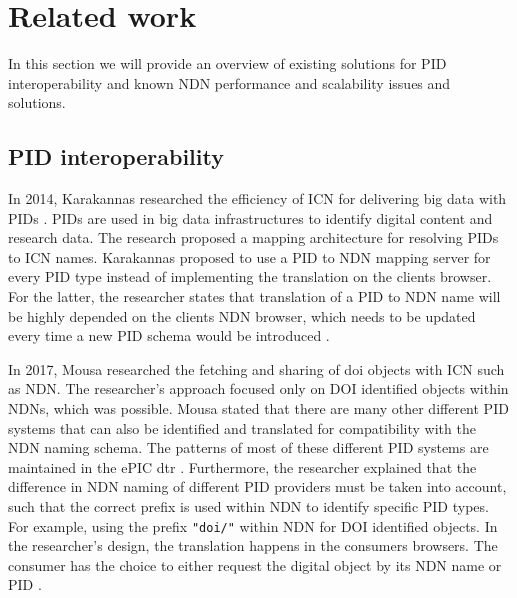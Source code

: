 \section{Related work}
\label{introduction-related-work}

In this section we will provide an overview of existing solutions for PID interoperability and known NDN performance and scalability issues and solutions.

\subsection{PID interoperability}
\label{introduction-pid}
In 2014, Karakannas researched the efficiency of ICN for delivering big data with PIDs \cite{icn-bd}. PIDs are used in big data infrastructures to identify digital content and research data. The research proposed a mapping architecture for resolving PIDs to ICN names. Karakannas proposed to use a PID to NDN mapping server for every PID type instead of implementing the translation on the clients browser. For the latter, the researcher states that translation of a PID to NDN name will be highly depended on the clients NDN browser, which needs to be updated every time a new PID schema would be introduced \cite{icn-bd}.

In 2017, Mousa researched the fetching and sharing of \gls{doi} objects with ICN such as NDN. 
The researcher's approach focused only on DOI identified objects within NDNs, which was possible. Mousa stated that there are many other different PID systems that can also be identified and translated for compatibility with the NDN naming schema. The patterns of most of these different PID systems are maintained in the ePIC \gls{dtr} \cite{dtr}.
 Furthermore, the researcher explained that the difference in NDN naming of different PID providers must be taken into account, such that the correct prefix is used within NDN to identify specific PID types. For example, using the prefix \texttt{"doi/"} within NDN for DOI identified objects.
In the researcher's design, the translation happens in the consumers browsers. The consumer has the choice to either request the digital object by its NDN name or PID \cite{ndn-app-aware}.

